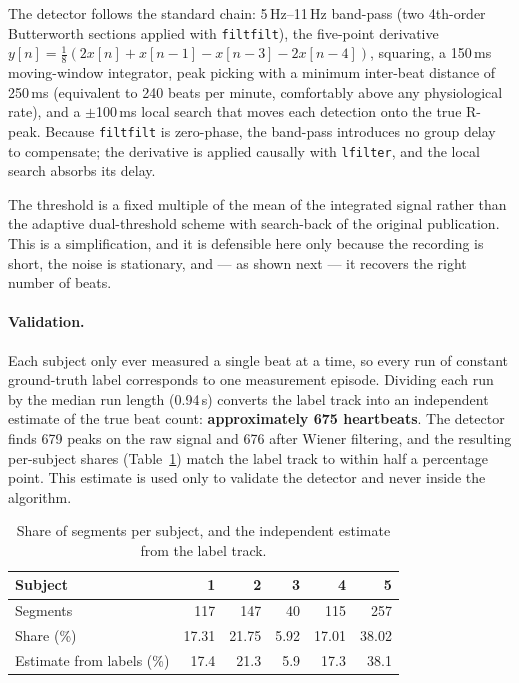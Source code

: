 \documentclass[11pt,a4paper]{article}
\newcommand{\hertz}{Hz}
\newcommand{\second}{s}
\newcommand{\milli}{m}
\newcommand{\num}[1]{#1}
\newcommand{\SI}[2]{#1\,#2}
\begin{document}
The detector follows the standard chain: \SI{5}{\hertz}--\SI{11}{\hertz} band-pass (two
4th-order Butterworth sections applied with \texttt{filtfilt}), the five-point derivative
$y[n]=\tfrac{1}{8}(2x[n]+x[n-1]-x[n-3]-2x[n-4])$, squaring, a \SI{150}{\milli\second}
moving-window integrator, peak picking with a minimum inter-beat distance of
\SI{250}{\milli\second} (equivalent to \num{240} beats per minute, comfortably above any
physiological rate), and a $\pm$\SI{100}{\milli\second} local search that moves each detection
onto the true R-peak. Because \texttt{filtfilt} is zero-phase, the band-pass introduces no
group delay to compensate; the derivative is applied causally with \texttt{lfilter}, and the
local search absorbs its delay.

The threshold is a fixed multiple of the mean of the integrated signal rather than the
adaptive dual-threshold scheme with search-back of the original publication. This is a
simplification, and it is defensible here only because the recording is short, the noise is
stationary, and --- as shown next --- it recovers the right number of beats.

\paragraph{Validation.} Each subject only ever measured a single beat at a time, so every run
of constant ground-truth label corresponds to one measurement episode. Dividing each run by
the median run length (\SI{0.94}{\second}) converts the label track into an independent
estimate of the true beat count: \textbf{approximately \num{675} heartbeats}. The detector
finds \num{679} peaks on the raw signal and \num{676} after Wiener filtering, and the
resulting per-subject shares (Table~\ref{tab:p1pct}) match the label track to within half a
percentage point. This estimate is used only to validate the detector and never inside the
algorithm.

\begin{table}[htbp]
\centering\small
\caption{Share of segments per subject, and the independent estimate from the label track.}
\label{tab:p1pct}
\begin{tabular}{lrrrrr}
\toprule
Subject & 1 & 2 & 3 & 4 & 5 \\
\midrule
Segments                    & 117 & 147 & 40 & 115 & 257 \\
Share (\%)                  & 17.31 & 21.75 & 5.92 & 17.01 & 38.02 \\
Estimate from labels (\%)   & 17.4 & 21.3 & 5.9 & 17.3 & 38.1 \\
\bottomrule
\end{tabular}
\end{table}
\end{document}
